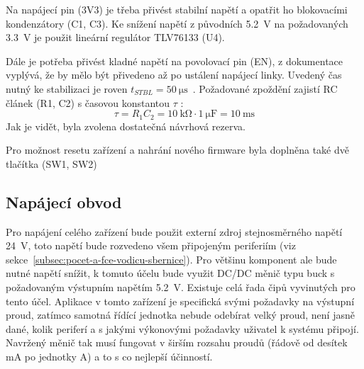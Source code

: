         Na napájecí pin (3V3) je třeba přivést stabilní napětí a opatřit ho blokovacími kondenzátory (C1, C3). Ke snížení napětí z původních \qty{5,2}{V} na požadovaných \qty{3,3}{V} je použit lineární regulátor TLV76133 (U4). 
        
        Dále je potřeba přivést kladné napětí na povolovací pin (EN), z dokumentace vyplývá, že by mělo být přivedeno až po ustálení napájecí linky. Uvedený čas nutný ke stabilizaci je roven \(t_{STBL}=\qty{50}{\micro\second}\)~\cite{esp32-datasheet}. Požadované zpoždění zajistí RC článek (R1, C2) s časovou konstantou \(\tau\) :
        \begin{equation}
            \tau=R_{1}C_{2}=\qty{10}{\kilo\ohm}\cdot \qty{1}{\micro\farad}=\qty{10}{\milli\second}
        \end{equation} 
        Jak je vidět, byla zvolena dostatečná návrhová rezerva. 

        Pro možnost resetu zařízení a nahrání nového firmware byla doplněna také dvě tlačítka (SW1, SW2)


    \clearpage
    \subsection{Napájecí obvod}
        \label{sec:ridici-jendotka-napajeci-obvod}
        Pro napájení celého zařízení bude použit externí zdroj stejnosměrného napětí \qty{24}{V}, toto napětí bude rozvedeno všem připojeným periferiím (viz sekce~\ref{subsec:pocet-a-fce-vodicu-sbernice}). Pro většinu komponent ale bude nutné napětí snížit, k tomuto účelu bude využit DC/DC měnič typu buck s požadovaným výstupním napětím \qty{5.2}{V}. Existuje celá řada čipů vyvinutých pro tento účel. Aplikace v tomto zařízení je specifická svými požadavky na výstupní proud, zatímco samotná řídící jednotka nebude odebírat velký proud, není jasně dané, kolik periferí a s jakými výkonovými požadavky uživatel k systému připojí. Navržený měnič tak musí fungovat v širším rozsahu proudů (řádově od desítek mA po jednotky A) a to s co nejlepší účinností. 
        
